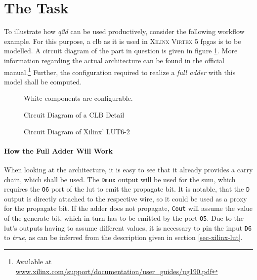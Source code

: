 \section{The Task}
	\label{sec-workflow-task}
	To illustrate how \emph{q2d} can be used productively, consider the following workflow example.
	For this purpose, a \gls{clb} as it is used in \textsc{Xilinx Virtex 5} \glspl{fpga} is to be modelled.
	A circuit diagram of the part in question is given in figure \ref{fig-clb-detail}.
	More information regarding the actual architecture can be found in the official manual.\footnote{
		Available at \url{www.xilinx.com/support/documentation/user_guides/ug190.pdf}
	}\cite{virtex5}
	Further, the configuration required to realize a \emph{full adder} with this model shall be computed.

	\begin{figure}[p]
	\centering
		\resizebox{0.9\textwidth}{!}{
		
		}
		\caption{Circuit Diagram of a CLB Detail}
		White components are configurable.
		\label{fig-clb-detail}
	\end{figure}		

	\begin{figure}[p]
	\centering
		\resizebox{!}{0.4\textheight}{
		
		}
		\caption{Circuit Diagram of Xilinx' LUT6-2 }
		\label{fig-lut}
	\end{figure}		

	\paragraph{How the Full Adder Will Work}
	When looking at the architecture, it is easy to see that it already provides a carry chain, which shall be used.
	The \texttt{Dmux} output will be used for the sum, which requires the \texttt{O6} port of the \gls{lut} to emit the propagate bit.
	It is notable, that the \texttt{D} output is directly attached to the respective wire, so it could be used as a proxy for the propagate bit.
	If the adder does not propagate, \texttt{Cout} will assume the value of the generate bit, which in turn has to be emitted by the port \texttt{O5}.
	Due to the \gls{lut}'s outputs having to assume different values, it is necessary to pin the input \texttt{D6} to \emph{true}, as can be inferred from the description given in section \ref{sec-xilinx-lut}.


